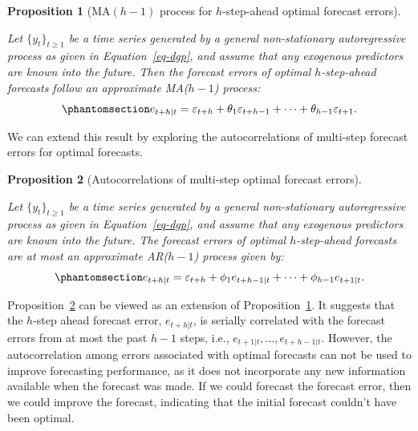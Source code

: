 \documentclass[
  11pt,
  a4paper,
]{article}
\theoremstyle{plain}
\newtheorem{proposition}{Proposition}[section]
\theoremstyle{remark}
\begin{document}
\begin{proposition}[MA\((h-1)\) process for \(h\)-step-ahead optimal
forecast errors]\protect\hypertarget{prp-ma}{}\label{prp-ma}

Let \(\{y_t\}_{t \geq 1}\) be a time series generated by a general
non-stationary autoregressive process as given in Equation~\ref{eq-dgp},
and assume that any exogenous predictors are known into the future. Then
the forecast errors of optimal \(h\)-step-ahead forecasts follow an
approximate MA(\(h-1\)) process:
\begin{equation}\phantomsection\label{eq-ma}{
e_{t+h|t} = \varepsilon_{t+h} + \theta_1\varepsilon_{t+h-1} + \cdots + \theta_{h-1}\varepsilon_{t+1}.
}\end{equation}

\end{proposition}


We can extend this result by exploring the autocorrelations of
multi-step forecast errors for optimal forecasts.

\begin{proposition}[Autocorrelations of multi-step optimal forecast
errors]\protect\hypertarget{prp-ar}{}\label{prp-ar}

Let \(\{y_t\}_{t \geq 1}\) be a time series generated by a general
non-stationary autoregressive process as given in Equation~\ref{eq-dgp},
and assume that any exogenous predictors are known into the future. The
forecast errors of optimal \(h\)-step-ahead forecasts are at most an
approximate AR(\(h-1\)) process given by:
\begin{equation}\phantomsection\label{eq-ar}{
e_{t+h|t} = \varepsilon_{t+h} + \phi_1e_{t+h-1|t} + \cdots + \phi_{h-1}e_{t+1|t}.
}\end{equation}

\end{proposition}


Proposition~\ref{prp-ar} can be viewed as an extension of
Proposition~\ref{prp-ma}. It suggests that the \(h\)-step ahead forecast
error, \(e_{t+h|t}\), is serially correlated with the forecast errors
from at most the past \(h-1\) steps, i.e.,
\(e_{t+1|t}, \ldots, e_{t+h-1|t}\). However, the autocorrelation among
errors associated with optimal forecasts can not be used to improve
forecasting performance, as it does not incorporate any new information
available when the forecast was made. If we could forecast the forecast
error, then we could improve the forecast, indicating that the initial
forecast couldn't have been optimal.
\end{document}
